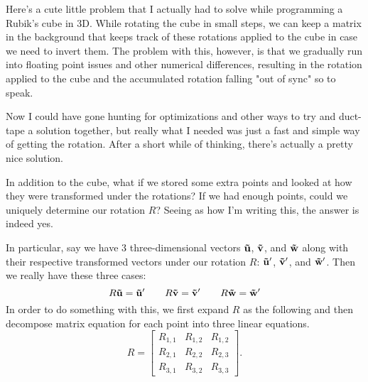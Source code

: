 Here's a cute little problem that I actually had to solve while programming a
Rubik's cube in 3D. While rotating the cube in small steps, we can keep a
matrix in the background that keeps track of these rotations applied to the
cube in case we need to invert them.  The problem with this, however, is that we gradually run
into floating point issues and other numerical differences, resulting in the
rotation applied to the cube and the accumulated rotation falling "out of sync"
so to speak.

Now I could have gone hunting for optimizations and other ways to try and
duct-tape a solution together, but really what I needed was just a fast and
simple way of getting the rotation.  After a short while of thinking, there's
actually a pretty nice solution.

In addition to the cube, what if we stored some extra points and looked at how
they were transformed under the rotations? If we had enough points, could we
uniquely determine our rotation \( R \)? Seeing as how I'm writing this, the
answer is indeed yes.

In particular, say we have \( 3 \) three-dimensional vectors \( \mathbf{\vec{u}} \), \( \mathbf{\vec{v}} \), and \( \mathbf{\vec{w}} \) along with their respective transformed vectors under our rotation \( R \): \( \mathbf{\vec{u}}' \), \( \mathbf{\vec{v}}' \), and \( \mathbf{\vec{w}}' \). Then we really have these three cases:
\begingroup
\newcommand{\point}[1]{\ensuremath{\begin{bmatrix} #1_1 \\ #1_2 \\ #1_3 \end{bmatrix}}}
\newcommand{\R}{\ensuremath{\begin{bmatrix} R_{1,1} & R_{1,2} & R_{1,2} \\ R_{2,1} & R_{2,2} & R_{2,3} \\ R_{3,1} & R_{3,2} & R_{3,3} \end{bmatrix}}}
\[
    R \mathbf{\vec{u}} = \mathbf{\vec{u}}' \qquad R \mathbf{\vec{v}} = \mathbf{\vec{v}}' \qquad R \mathbf{\vec{w}} = \mathbf{\vec{w}}'
\]
In order to do something with this, we first expand \( R \) as the following
and then decompose matrix equation for each point into three linear equations.
\[
    R = \R
.\]

